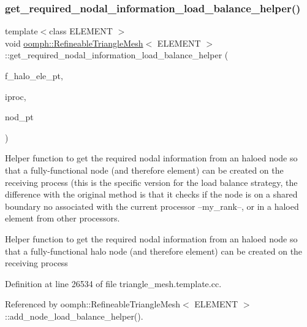 \subsubsection{\texorpdfstring{get\+\_\+required\+\_\+nodal\+\_\+information\+\_\+load\+\_\+balance\+\_\+helper()}{get\_required\_nodal\_information\_load\_balance\_helper()}}
{\footnotesize\ttfamily template$<$class E\+L\+E\+M\+E\+NT $>$ \\
void \hyperlink{classoomph_1_1RefineableTriangleMesh}{oomph\+::\+Refineable\+Triangle\+Mesh}$<$ E\+L\+E\+M\+E\+NT $>$\+::get\+\_\+required\+\_\+nodal\+\_\+information\+\_\+load\+\_\+balance\+\_\+helper (\begin{DoxyParamCaption}\item[{Vector$<$ Vector$<$ Finite\+Element $\ast$$>$ $>$ \&}]{f\+\_\+halo\+\_\+ele\+\_\+pt,  }\item[{unsigned \&}]{iproc,  }\item[{Node $\ast$}]{nod\+\_\+pt }\end{DoxyParamCaption})\hspace{0.3cm}{\ttfamily [protected]}}



Helper function to get the required nodal information from an haloed node so that a fully-\/functional node (and therefore element) can be created on the receiving process (this is the specific version for the load balance strategy, the difference with the original method is that it checks if the node is on a shared boundary no associated with the current processor --my\+\_\+rank--, or in a haloed element from other processors. 

Helper function to get the required nodal information from an haloed node so that a fully-\/functional halo node (and therefore element) can be created on the receiving process 

Definition at line 26534 of file triangle\+\_\+mesh.\+template.\+cc.



Referenced by oomph\+::\+Refineable\+Triangle\+Mesh$<$ E\+L\+E\+M\+E\+N\+T $>$\+::add\+\_\+node\+\_\+load\+\_\+balance\+\_\+helper().

\mbox{\label{classoomph_1_1RefineableTriangleMesh_a51a28f4e7fccb020234c055bb42b8ef5}} 
